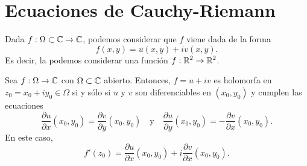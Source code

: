 \section{Ecuaciones de Cauchy-Riemann}
Dada $\displaystyle f : \Omega \subset \mathbb{C}\to \mathbb{C} $, podemos considerar que $\displaystyle f $ viene dada de la forma
\[f\left(x,y\right) = u\left(x,y\right) + iv\left(x,y\right) .\]
Es decir, la podemos considerar una función $\displaystyle f : \mathbb{R}^{2} \to \mathbb{R}^{2} $. 
\begin{theorem}
Sea $\displaystyle f : \Omega \to \mathbb{C} $ con $\displaystyle \Omega \subset \mathbb{C} $ abierto. Entonces, $\displaystyle f=u + iv $ es holomorfa en $\displaystyle z_{0}=x_{0} + iy_{0} \in \Omega  $ si y sólo si $\displaystyle u $ y $\displaystyle v $ son diferenciables en $\displaystyle \left(x_{0}, y_{0}\right) $ y cumplen las ecuaciones
\[\frac{\partial u}{\partial x}\left(x_{0}, y_{0}\right)=\frac{\partial v}{\partial y}\left(x_{0}, y_{0}\right) \quad \text{y} \quad \frac{\partial u}{\partial y}\left(x_{0}, y_{0}\right)=-\frac{\partial v}{\partial x} \left(x_{0}, y_{0}\right).\]
En este caso, 
\[f'\left(z_{0}\right)=\frac{\partial u}{\partial x}\left(x_{0}, y_{0}\right) + i\frac{\partial v}{\partial x}\left(x_{0}, y_{0}\right) .\]
\end{theorem}
